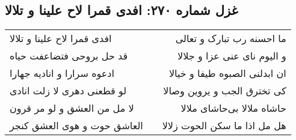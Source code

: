 \begin{center}
\section*{غزل شماره ۲۷۰: افدی قمرا لاح علینا و تلالا}
\label{sec:0270}
\begin{longtable}{l p{0.5cm} r}
افدی قمرا لاح علینا و تلالا
&&
ما احسنه رب تبارک و تعالی
\\
قد حل بروحی فتضاعفت حیاه
&&
و الیوم نای عنی عزا و جلالا
\\
ادعوه سرارا و انادیه جهارا
&&
ان ابدلنی الصبوه طیفا و خیالا
\\
لو قطعنی دهری لا زلت انادی
&&
کی تخترق الجب و یروین وصالا
\\
لا مل من العشق و لو مر قرون
&&
حاشاه ملالا بی‌حاشای ملالا
\\
العاشق حوت و هوی العشق کنجر
&&
هل مل اذا ما سکن الحوت زلالا
\\
\end{longtable}
\end{center}
